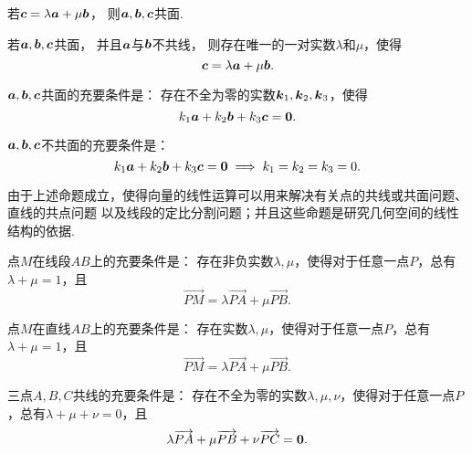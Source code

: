 \begin{theorem}
若\(\boldsymbol{c} = \lambda \boldsymbol{a} + \mu \boldsymbol{b}\)，
则\(\boldsymbol{a},\boldsymbol{b},\boldsymbol{c}\)共面.
\end{theorem}

\begin{theorem}
若\(\boldsymbol{a},\boldsymbol{b},\boldsymbol{c}\)共面，
并且\(\boldsymbol{a}\)与\(\boldsymbol{b}\)不共线，
则存在唯一的一对实数\(\lambda\)和\(\mu\)，使得\[
\boldsymbol{c} = \lambda \boldsymbol{a} + \mu \boldsymbol{b}.
\]
\end{theorem}

\begin{theorem}\label{theorem:解析几何.三向量共面的充要条件1}
\(\boldsymbol{a},\boldsymbol{b},\boldsymbol{c}\)共面的充要条件是：
存在不全为零的实数\(\boldsymbol{k}_1,\boldsymbol{k}_2,\boldsymbol{k}_3\)，使得\[
	k_1 \boldsymbol{a} + k_2 \boldsymbol{b} + k_3 \boldsymbol{c} = \boldsymbol{0}.
\]
\end{theorem}

\begin{corollary}\label{theorem:解析几何.三向量不共面的充要条件1}
\(\boldsymbol{a},\boldsymbol{b},\boldsymbol{c}\)不共面的充要条件是：\[
	k_1 \boldsymbol{a} + k_2 \boldsymbol{b} + k_3 \boldsymbol{c} = \boldsymbol{0}
	\implies
	k_1 = k_2 = k_3 = 0.
\]
\end{corollary}

由于上述命题成立，使得向量的线性运算可以用来解决有关点的共线或共面问题、直线的共点问题
以及线段的定比分割问题；并且这些命题是研究几何空间的线性结构的依据.

\begin{theorem}
点\(M\)在线段\(AB\)上的充要条件是：
存在非负实数\(\lambda,\mu\)，使得对于任意一点\(P\)，总有\(\lambda+\mu=1\)，且\[
\vec{PM} = \lambda \vec{PA} + \mu \vec{PB}.
\]
\end{theorem}

\begin{theorem}
点\(M\)在直线\(AB\)上的充要条件是：
存在实数\(\lambda,\mu\)，使得对于任意一点\(P\)，总有\(\lambda+\mu=1\)，且\[
\vec{PM} = \lambda \vec{PA} + \mu \vec{PB}.
\]
\end{theorem}

\begin{theorem}
三点\(A,B,C\)共线的充要条件是：
存在不全为零的实数\(\lambda,\mu,\nu\)，使得对于任意一点\(P\)，总有\(\lambda+\mu+\nu=0\)，且\[
\lambda \overrightarrow{PA} + \mu \overrightarrow{PB} + \nu \overrightarrow{PC} = \boldsymbol{0}.
\]
\end{theorem}

